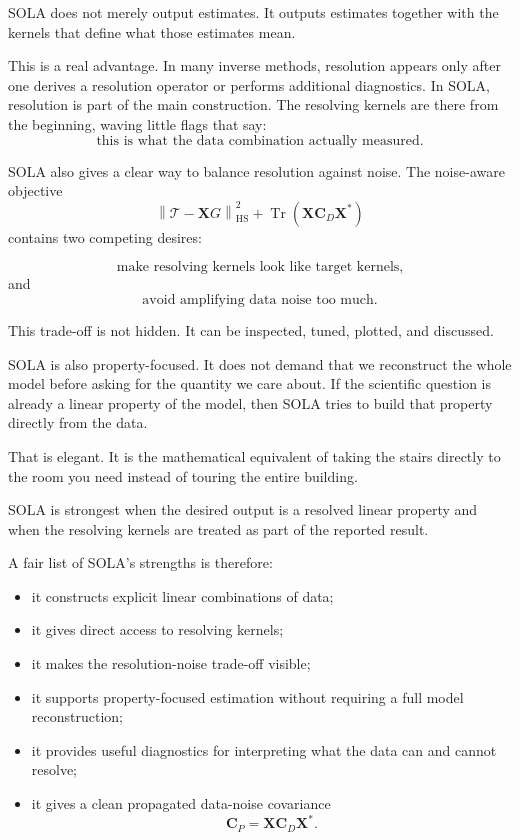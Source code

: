 \documentclass[11pt,openany]{book}
\theoremstyle{definition}
\theoremstyle{remark}
\newcommand{\Tau}{\mathcal{T}}
\newcommand{\Tr}{\operatorname{Tr}}
\newcommand{\HS}{\mathrm{HS}}
\begin{document}
\begin{lessonbox}
SOLA does not merely output estimates. It outputs estimates together with the kernels that
define what those estimates mean.
\end{lessonbox}

This is a real advantage. In many inverse methods, resolution appears only after one derives a
resolution operator or performs additional diagnostics. In SOLA, resolution is part of the main
construction. The resolving kernels are there from the beginning, waving little flags that say:
\[
  \text{this is what the data combination actually measured.}
\]

SOLA also gives a clear way to balance resolution against noise. The noise-aware objective
\[
  \left\|
    \Tau-\mathbf XG
  \right\|_{\HS}^2
  +
  \Tr(\mathbf X\mathbf C_D\mathbf X^*)
\]
contains two competing desires:

\[
  \text{make resolving kernels look like target kernels,}
\]
and
\[
  \text{avoid amplifying data noise too much.}
\]

This trade-off is not hidden. It can be inspected, tuned, plotted, and discussed.

SOLA is also property-focused. It does not demand that we reconstruct the whole model before
asking for the quantity we care about. If the scientific question is already a linear property of
the model, then SOLA tries to build that property directly from the data.

That is elegant. It is the mathematical equivalent of taking the stairs directly to the room you
need instead of touring the entire building.

\begin{checkpointbox}
SOLA is strongest when the desired output is a resolved linear property and when the resolving
kernels are treated as part of the reported result.
\end{checkpointbox}

A fair list of SOLA's strengths is therefore:

\begin{itemize}[leftmargin=*]
  \item it constructs explicit linear combinations of data;
  \item it gives direct access to resolving kernels;
  \item it makes the resolution-noise trade-off visible;
  \item it supports property-focused estimation without requiring a full model reconstruction;
  \item it provides useful diagnostics for interpreting what the data can and cannot resolve;
  \item it gives a clean propagated data-noise covariance
  \[
    \mathbf C_P=\mathbf X\mathbf C_D\mathbf X^*.
  \]
\end{itemize}
\end{document}
